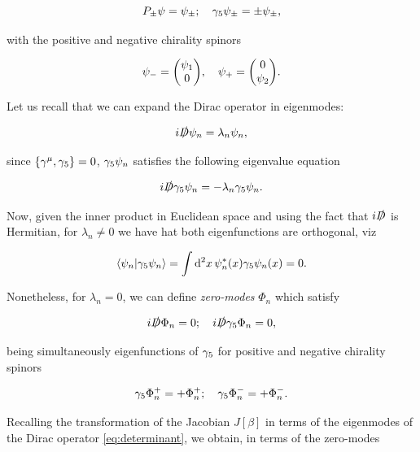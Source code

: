 \begin{equation}
    P_\pm  \psi = \psi_{\pm};\quad \gamma_5\psi_{\pm} = \pm \psi_{\pm},
\end{equation}

with the positive and negative chirality spinors

\begin{equation}
    \psi_-= \mqty(\psi_1  \\ 0), \quad \psi_+ = \mqty( 0 \\ \psi_2).\label{eq:spinorchiral}
\end{equation}

Let us recall that we can expand the Dirac operator in eigenmodes:

\begin{equation}
    i\slashed{D}\psi_n  = \lambda_n \psi_n,
\end{equation}

since $\acomm{\gmu}{\gf}=0$, $\gamma_5\psi_n$ satisfies the following eigenvalue equation 

\begin{equation}
     i\slashed{D}\gamma_5\psi_n = - \lambda_n \gamma_5\psi_n.
\end{equation}

Now, given the inner product in Euclidean space and using the fact that $i\slashed{D}$ is Hermitian, for $\lambda_n\neq 0$ we have hat both eigenfunctions are orthogonal, viz

\begin{equation}
    \braket{\psi_n}{\gamma_5\psi_n} = \int \dd[2]{x} \psi_n^*(x) \gamma_5\psi_n(x) =0.
\end{equation}

Nonetheless, for $\lambda_n = 0$, we can define \emph{zero-modes} $\Phi_n$ which satisfy

\begin{equation}
     i\slashed{D}\Phi_n = 0;\quad i\slashed{D}\gamma_5\Phi_n = 0,
\end{equation}

being simultaneously eigenfunctions of $\gamma_5$ for positive and negative chirality spinors

\begin{equation}
    \gamma_5 \Phi_{n}^+ = + \Phi_{n}^+;\quad \gamma_5 \Phi_{n}^- = + \Phi_{n}^-.
\end{equation}

Recalling the transformation of the Jacobian $J[\beta]$ in terms of the eigenmodes of the Dirac operator  \eqref{eq:determinant}, we obtain, in terms of the zero-modes

